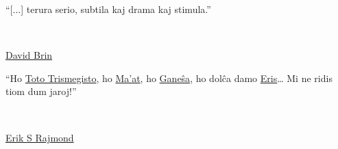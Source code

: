 \makeatletter
\newlength{\beforeblurbskip}
  \setlength{\beforeblurbskip}{.5\baselineskip}
\newlength{\afterblurbskip}
  \setlength{\afterblurbskip}{.5\baselineskip}
\newlength{\blurbwidth}
  \setlength{\blurbwidth}{.6\textwidth}
\newlength{\blurbrule}
  \setlength{\blurbrule}{.4\p@}
\newcommand{\blurbsize}{\small}
\newcommand{\blurbflush}{flushright}

\newcommand{\blurbfontsize}[1]{\def\blurbsize{#1}}
\newcommand{\blurbposition}[1]{\long\def\blurbflush{#1}}
\newcommand{\blurbtextposition}[1]{\def\textflush{#1}}
\newcommand{\blurbsourceposition}[1]{\def\sourceflush{#1}}

\newcommand{\@blurbrule}{\rule[.5ex]{\blurbwidth}{\blurbrule}}

\newcommand{\@blurbtext}[1]{%
  \begin{minipage}{\blurbwidth}\begin{\textflush} #1\par
    \ifdim\blurbrule>\z@ \@blurbrule \else \vspace*{1ex} \fi
  \end{\textflush}\end{minipage}}

  \newcommand{\@blurbsource}[1]{%
  \begin{minipage}{\blurbwidth}
    \begin{\sourceflush} #1\par
  \end{\sourceflush}\end{minipage}}

\newcommand{\blurb}[2]{
	\vspace{\beforeblurbskip}
	{\blurbsize
	\begin{\blurbflush}
		\begin{minipage}{8cm} \@blurbtext{#1}\\ \@blurbsource{#2} \end{minipage}
	\end{\blurbflush}
	\vspace{\afterblurbskip}}}
\makeatother

\thispagestyle{empty}
\blurb{“[...] terura serio, subtila kaj drama kaj stimula.”}{\href{https://wikipedia.org/wiki/David_Brin}{David Brin}}
\blurb{“Ho \href{https://eo.wikipedia.org/wiki/Hermeso_Trismegisto}{Toto Trismegisto}, ho \href{https://eo.wikipedia.org/wiki/Maat}{Ma’at}, ho \href{https://eo.wikipedia.org/wiki/Ganeŝa}{Ganeŝa}, ho dolĉa damo \href{https://eo.wikipedia.org/wiki/Diskordianismo}{Eris}… Mi ne ridis tiom dum jaroj!”}{\href{https://eo.wikipedia.org/wiki/Eric_S._Raymond}{Erik S Rajmond}}
\thispagestyle{empty}
